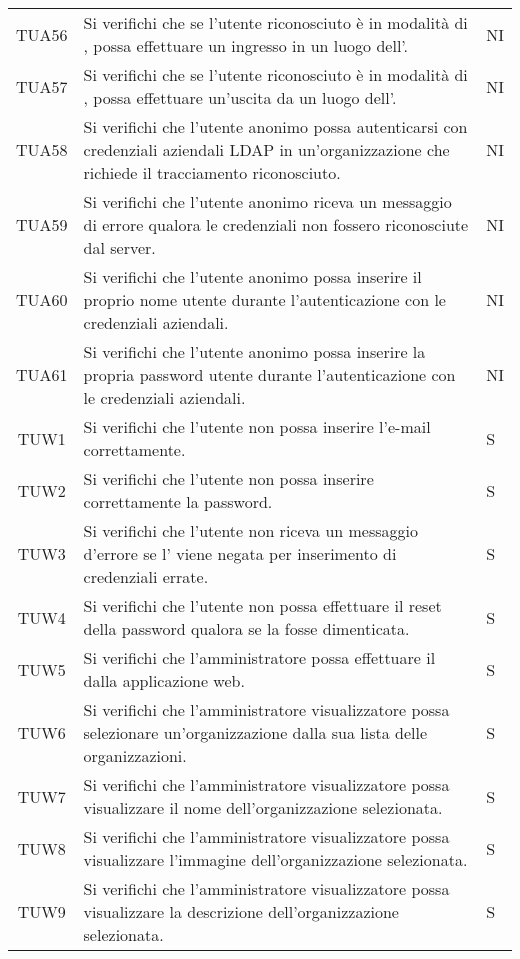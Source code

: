 {\begin{longtable}{ c C{13cm} C{1cm}}
TUA56 & Si verifichi che se l'utente riconosciuto è in modalità di , possa effettuare un ingresso in un luogo dell'. & NI \\
TUA57 & Si verifichi che se l'utente riconosciuto è in modalità di , possa effettuare un'uscita da un luogo dell'. & NI \\
TUA58 & Si verifichi che l’utente anonimo possa autenticarsi con credenziali aziendali LDAP in un'organizzazione che richiede il tracciamento riconosciuto. & NI \\
TUA59 & Si verifichi che l’utente anonimo riceva un messaggio di errore qualora le credenziali  non fossero riconosciute dal server. & NI \\
TUA60 & Si verifichi che l’utente anonimo possa inserire il proprio nome utente durante l'autenticazione con le credenziali  aziendali. & NI \\
TUA61 & Si verifichi che l’utente anonimo possa inserire la propria password utente durante l'autenticazione con le credenziali  aziendali. & NI \\
TUW1 & Si verifichi che l’utente non  possa inserire l'e-mail correttamente. & S \\
TUW2 & Si verifichi che l’utente non  possa inserire correttamente la password. & S \\
TUW3 & Si verifichi che l’utente non  riceva un messaggio d'errore se l' viene negata per inserimento di credenziali errate. & S \\
TUW4 & Si verifichi che l’utente non  possa effettuare il reset della password qualora se la fosse dimenticata. & S \\
TUW5 & Si verifichi che l'amministratore  possa effettuare il  dalla applicazione web. & S \\
TUW6 & Si verifichi che l’amministratore visualizzatore possa selezionare un’organizzazione dalla sua lista delle organizzazioni. & S \\
TUW7 & Si verifichi che l'amministratore visualizzatore possa visualizzare il nome dell'organizzazione selezionata. & S \\
TUW8 & Si verifichi che l'amministratore visualizzatore possa visualizzare l’immagine dell'organizzazione selezionata. & S \\
TUW9 & Si verifichi che l'amministratore visualizzatore possa visualizzare la descrizione dell'organizzazione selezionata. & S \\

\end{longtable}}
